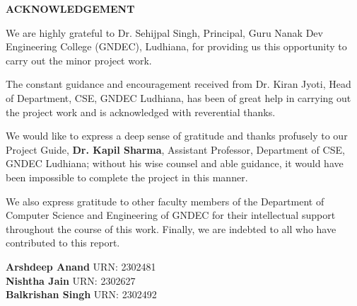\documentclass[12pt,a4paper]{report}
\begin{document}
\newpage
\begin{center}{\fontsize{16pt}{18pt}\selectfont\textbf{ACKNOWLEDGEMENT}}\end{center}
\noindent
We are highly grateful to Dr. Sehijpal Singh, Principal, Guru Nanak Dev Engineering College (GNDEC), Ludhiana, for providing us this opportunity to carry out the minor project work.

The constant guidance and encouragement received from Dr. Kiran Jyoti, Head of Department, CSE, GNDEC Ludhiana, has been of great help in carrying out the project work and is acknowledged with reverential thanks.

We would like to express a deep sense of gratitude and thanks profusely to our Project Guide, \textbf{Dr. Kapil Sharma}, Assistant Professor, Department of CSE, GNDEC Ludhiana; without his wise counsel and able guidance, it would have been impossible to complete the project in this manner.

We also express gratitude to other faculty members of the Department of Computer Science and Engineering of GNDEC for their intellectual support throughout the course of this work. Finally, we are indebted to all who have contributed to this report.

\vspace{1cm}
\noindent\textbf{Arshdeep Anand} \hfill URN: 2302481\\
\noindent\textbf{Nishtha Jain} \hfill URN: 2302627\\
\noindent\textbf{Balkrishan Singh} \hfill URN: 2302492\\
\end{document}
